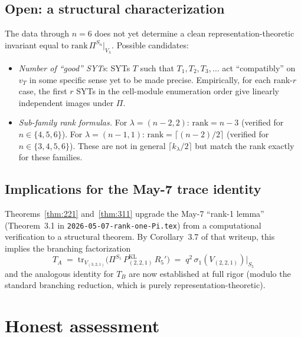 \documentclass[11pt]{article}
\theoremstyle{definition}
\begin{document}
\subsection{Open: a structural characterization}

The data through $n=6$ does not yet determine a clean
representation-theoretic invariant equal to
$\mathrm{rank}\,\Pi^{S_n}|_{V_\lambda}$. Possible candidates:
\begin{itemize}[leftmargin=2em,topsep=0.3em,itemsep=0.2em]
\item \emph{Number of ``good'' SYTs}: SYTs $T$ such that
$T_1, T_2, T_3, \ldots$ act ``compatibly'' on $v_T$ in some
specific sense yet to be made precise. Empirically, for each
rank-$r$ case, the first $r$ SYTs in the cell-module enumeration
order give linearly independent images under $\Pi$.
\item \emph{Sub-family rank formulas.}
For $\lambda = (n-2, 2)$: $\mathrm{rank} = n - 3$ (verified for
$n \in \{4,5,6\}$). For $\lambda = (n-1, 1)$: $\mathrm{rank} =
\lceil (n-2)/2 \rceil$ (verified for $n \in \{3,4,5,6\}$).
These are not in general $\lceil k_\lambda/2 \rceil$ but match the
rank exactly for these families.
\end{itemize}

\subsection{Implications for the May-7 trace identity}

Theorems~\ref{thm:221} and~\ref{thm:311} upgrade the May-7
``rank-1 lemma'' (Theorem~3.1 in
\texttt{2026-05-07-rank-one-Pi.tex}) from a computational verification
to a structural theorem. By Corollary~3.7 of that writeup, this
implies the branching factorization
\[
T_A \;=\; \mathrm{tr}_{V_{(3,2,1)}}\!\bigl(\Pi^{S_5}\,P_{(2,2,1)}^{\mathrm{KL}}\,R_5'\bigr) \;=\; q^2\,\sigma_1(V_{(2,2,1)})\big|_{S_5}
\]
and the analogous identity for $T_B$ are now established at full rigor
(modulo the standard branching reduction, which is purely
representation-theoretic).

\section{Honest assessment}\label{sec:honest}
\end{document}
